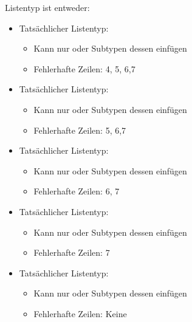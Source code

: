 \documentclass{../tuda-beamer}
\begin{document}
    \begin{frame}[c]
        Listentyp ist entweder:

        \begin{itemize}
            \item Tatsächlicher Listentyp: 
            \begin{itemize}
                \item Kann nur  oder Subtypen dessen einfügen
                \item Fehlerhafte Zeilen: 4, 5, 6,7
            \end{itemize}
            \item Tatsächlicher Listentyp: 
            \begin{itemize}
                \item Kann nur  oder Subtypen dessen einfügen
                \item Fehlerhafte Zeilen: 5, 6,7
            \end{itemize}
            \item Tatsächlicher Listentyp: 
            \begin{itemize}
                \item Kann nur  oder Subtypen dessen einfügen
                \item Fehlerhafte Zeilen: 6, 7
            \end{itemize}
            \item Tatsächlicher Listentyp: 
            \begin{itemize}
                \item Kann nur  oder Subtypen dessen einfügen
                \item Fehlerhafte Zeilen: 7
            \end{itemize}
            \item Tatsächlicher Listentyp: 
            \begin{itemize}
                \item Kann nur  oder Subtypen dessen einfügen
                \item Fehlerhafte Zeilen: Keine
            \end{itemize}
        \end{itemize}
    \end{frame}
\end{document}
